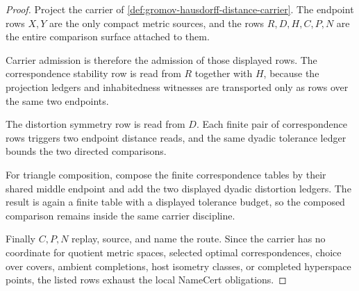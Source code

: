 \begin{proof}
Project the carrier of \autoref{def:gromov-hausdorff-distance-carrier}. The endpoint rows $X,Y$ are the only compact metric sources, and the rows $R,D,H,C,P,N$ are the entire comparison surface attached to them.

Carrier admission is therefore the admission of those displayed rows. The correspondence stability row is read from $R$ together with $H$, because the projection ledgers and inhabitedness witnesses are transported only as rows over the same two endpoints.

The distortion symmetry row is read from $D$. Each finite pair of correspondence rows triggers two endpoint distance reads, and the same dyadic tolerance ledger bounds the two directed comparisons.

For triangle composition, compose the finite correspondence tables by their shared middle endpoint and add the two displayed dyadic distortion ledgers. The result is again a finite table with a displayed tolerance budget, so the composed comparison remains inside the same carrier discipline.

Finally $C,P,N$ replay, source, and name the route. Since the carrier has no coordinate for quotient metric spaces, selected optimal correspondences, choice over covers, ambient completions, host isometry classes, or completed hyperspace points, the listed rows exhaust the local NameCert obligations.
\end{proof}

